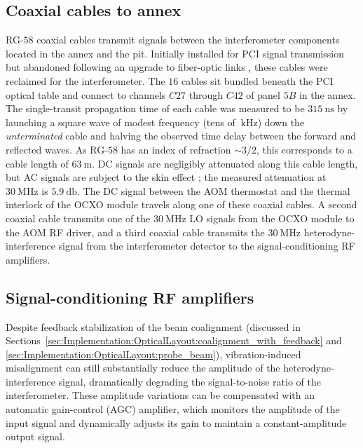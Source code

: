 \subsection{Coaxial cables to \diiid\space annex}
\label{sec:Implementation:Hardware:coax}
RG-$58$ coaxial cables transmit signals
between the interferometer components
located in the \diiid\space annex and the \diiid\space pit.
Initially installed for PCI signal transmission but
abandoned following an upgrade to fiber-optic links
\cite[Sec.~3.3.3]{dorris_phd},
these cables were reclaimed for the interferometer.
The $16$ cables sit bundled beneath the PCI optical table and
connect to channels $C27$ through $C42$
of panel $5B$ in the \diiid\space annex.
The single-transit propagation time of each cable
was measured to be $\SI{315}{\nano\second}$
by launching a square wave of modest frequency
(tens of $\SI{}{\kilo\hertz}$)
down the \emph{unterminated} cable and
halving the observed time delay between the forward and reflected waves.
As RG-$58$ has an index of refraction $\sim 3 / 2$,
this corresponds to a cable length of $\SI{63}{\meter}$.
DC signals are negligibly attenuated along this cable length, but
AC signals are subject to the skin effect
\cite[Sec.~H.1.4]{horowitz_and_hill};
the measured attenuation at $\SI{30}{\mega\hertz}$ is $\SI{5.9}{\decibel}$.
The DC signal between the AOM thermostat and
the thermal interlock of the OCXO module
travels along one of these coaxial cables.
A second coaxial cable transmits
one of the $\SI{30}{\mega\hertz}$ LO signals
from the OCXO module
to the AOM RF driver, and
a third coaxial cable transmits
the $\SI{30}{\mega\hertz}$ heterodyne-interference signal
from the interferometer detector
to the signal-conditioning RF amplifiers.


\subsection{Signal-conditioning RF amplifiers}
\label{sec:Implementation:Hardware:RF_amps}
Despite feedback stabilization of the beam coalignment
(discussed in
Sections~\ref{sec:Implementation:OpticalLayout:coalignment_with_feedback}
and \ref{sec:Implementation:OpticalLayout:probe_beam}),
vibration-induced misalignment can still substantially reduce
the amplitude of the heterodyne-interference signal,
dramatically degrading the signal-to-noise ratio of the interferometer.
These amplitude variations can be compensated
with an automatic gain-control (AGC) amplifier, which
monitors the amplitude of the input signal and
dynamically adjusts its gain
to maintain a constant-amplitude output signal.


